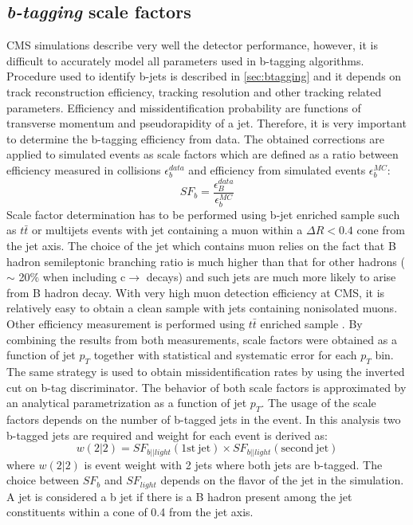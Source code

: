 
\subsection{\textit{b-tagging} scale factors}
\label{sec:btag}

CMS simulations describe very well the detector performance, however, it is difficult to accurately model all parameters used in b-tagging algorithms. Procedure used to identify b-jets is described in \ref{sec:btagging} and it depends on track reconstruction efficiency, tracking resolution and other tracking related parameters. Efficiency and missidentification probability are functions of transverse momentum and pseudorapidity of a jet. Therefore, it is very important to determine the b-tagging efficiency from data. The obtained corrections are applied to simulated events as scale factors which are defined as a ratio between efficiency measured in collisions $\epsilon_b^{data}$ and efficiency from simulated events $\epsilon_b^{MC}$:
\begin{equation}
SF_b=\frac{\epsilon_B^{data}}{\epsilon_b^{MC}}
\end{equation}
Scale factor determination has to be performed using b-jet enriched sample such as $t\bar{t}$ or multijets events with jet containing a muon within a $\Delta R <0.4$ cone from the jet axis. The choice of the jet which contains muon relies on the fact that B hadron semileptonic branching ratio is much higher than that for other hadrons ($\sim$ 20$\%$ when including c$\rightarrow$ decays) and such jets are much more likely to arise from B hadron decay. With very high muon detection efficiency at CMS, it is relatively easy to obtain a clean sample with jets containing nonisolated muons. Other efficiency measurement is performed using $t\bar{t}$ enriched sample \cite{CMS:2013vea}.
By combining the results from both measurements, scale factors were obtained as a function of jet $p_T$ together with statistical and systematic error for each $p_T$ bin. The same strategy is used to obtain missidentification rates by using the inverted cut on b-tag discriminator. The behavior of both scale factors is approximated by an analytical parametrization as a function of jet $p_T$.  
The usage of the scale factors depends on the number of b-tagged jets in the event. In this analysis two b-tagged jets are required and weight for each event is derived as:
\begin{equation}
w(2|2)=SF_{b||light}(\mathrm{1st\ jet})\times SF_{b||light}(\mathrm{second\ jet})
\end{equation}
where $w(2|2)$ is event weight with 2 jets where both jets are b-tagged. The choice between $SF_{b}$ and $SF_{light}$ depends on the flavor of the jet in the simulation. A jet is considered a b jet if there is a B hadron present among the jet constituents within a cone of 0.4 from the jet axis.    

